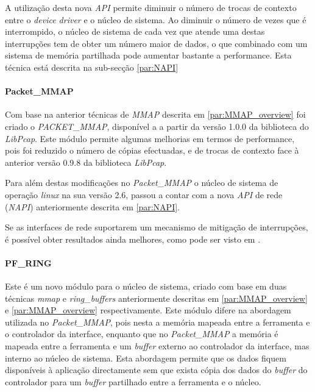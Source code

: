 A utilização desta nova \textit{API} permite diminuir o número de trocas de contexto entre o \textit{device driver} e o núcleo de sistema. Ao diminuir o número de vezes que é interrompido, o núcleo de sistema de cada vez que atende uma destas interrupções tem de obter um número maior de dados, o que combinado com um sistema de memória partilhada pode aumentar bastante a performance. Esta técnica está descrita na sub-secção \ref{par:NAPI}

\paragraph*{Packet\_MMAP}

Com base na anterior técnicas de \textit{MMAP} descrita em \ref{par:MMAP_overview} foi criado o \textit{PACKET\_MMAP}, disponível a a partir da versão 1.0.0 da biblioteca do \textit{LibPcap}. Este módulo permite algumas melhorias em termos de performance, pois foi reduzido o número de cópias efectuadas, e de trocas de contexto face à anterior versão 0.9.8 da biblioteca \textit{LibPcap}.

Para além destas modificações no \textit{Packet\_MMAP} o núcleo de sistema de operação \textit{linux} na sua versão 2.6, passou a contar com a nova \textit{API} de rede (\textit{NAPI}) anteriormente descrita em \ref{par:NAPI}.

Se as interfaces de rede suportarem um mecanismo de mitigação de interrupções, é possível obter resultados ainda melhores, como pode ser visto em \cite{Deri2004}.

% 

\paragraph*{PF\_RING}

Este é um novo módulo para o núcleo de sistema, criado com base em duas técnicas \textit{mmap} e \textit{ring\_buffers} anteriormente descritas em \ref{par:MMAP_overview} e \ref{par:MMAP_overview} respectivamente. Este módulo difere na abordagem utilizada no \textit{Packet\_MMAP}, pois nesta a memória mapeada entre a ferramenta e o controlador da interface, enquanto que no \textit{Packet\_MMAP} a memória é mapeada entre a ferramenta e um \textit{buffer} externo ao controlador da interface, mas interno ao núcleo de sistema.
Esta abordagem permite que os dados fiquem disponíveis à aplicação directamente sem que exista cópia dos dados do \textit{buffer} do controlador para um \textit{buffer} partilhado entre a ferramenta e o núcleo\cite{:PF_RING}.
 
